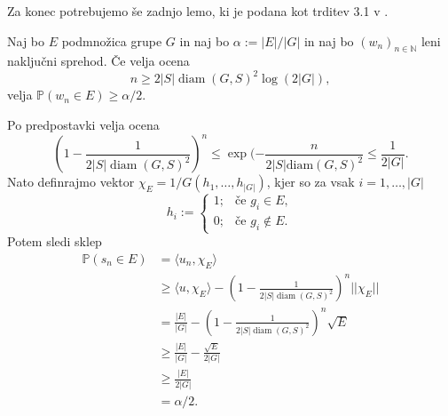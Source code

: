 Za konec potrebujemo še zadnjo lemo, ki je podana kot trditev 3.1 v \cite{Kozma_Thom_2016}. 
\begin{lema}\label{lem_posledica_neenakosti_csb}
Naj bo $E$ podmnožica grupe $G$ in naj bo $\alpha := \lvert E \rvert / \lvert G \rvert$ in naj bo $(w_n)_{n \in  \mathbb{N}}$ leni naključni sprehod.
Če velja ocena \begin{equation*}
n \ge 2 \lvert S \rvert \operatorname{diam}(G, S)^2 \log(2 \lvert G \rvert ), 
\end{equation*}  
    velja $\mathbb{P}(w_n \in E) \ge \alpha / 2$.
\end{lema}  
\begin{dokaz}
Po predpostavki velja ocena \begin{equation*}
  \left( 1 - \frac{1}{2 \lvert S \rvert \operatorname{diam}(G, S)^2 } \right)^{n} \le \exp(- \frac{n}{2 \lvert S \rvert \text{diam}(G, S)^2 } \le \frac{1}{2 \lvert G \rvert}.
\end{equation*}
Nato definrajmo vektor $\chi_E = 1 / G (h_1 , \ldots , h_{\lvert G \rvert })$, kjer so za vsak $ i = 1, \ldots, \lvert G \rvert $ \begin{equation*}
  h_i := \begin{cases}
      1; & \text{če } g_i \in E, \\
      0; & \text{če } g_i \not\in E.
  \end{cases}
\end{equation*}
Potem sledi sklep \begin{align*}
    \mathbb{P}(s_n \in E) &= \langle u_n , \chi_E \rangle  \\
     &\ge \langle u, \chi_E \rangle -  \left( 1 - \frac{1}{2 \lvert S \rvert \operatorname{diam}(G, S)^2 } \right)^{n} \lvert\lvert \chi_E \rvert\rvert \\
     &= \frac{\lvert E \rvert }{\lvert G \rvert } - \left( 1 - \frac{1}{2 \lvert S \rvert \operatorname{diam}(G, S)^2 } \right)^{n} \sqrt{E} \\
     &\ge  \frac{\lvert E \rvert }{\lvert G \rvert } - \frac{\sqrt{E}}{2 \lvert G \rvert } \\
     &\ge \frac{\lvert E \rvert }{2 \lvert G \rvert } \\
     &=  \alpha / 2.
\end{align*} 
\end{dokaz}

